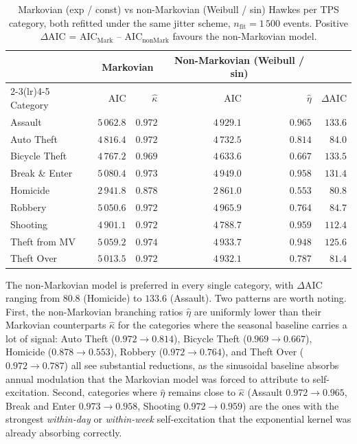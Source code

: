 \documentclass[article,shortnames,nojss]{jss}
\begin{document}
\begin{table}[h]
\centering\small
\caption{Markovian (exp / const) vs non-Markovian (Weibull / sin)
Hawkes per TPS category, both refitted under the same jitter
scheme, $n_{\mathrm{fit}} = 1\,500$ events.  Positive
$\Delta\mathrm{AIC}$ = AIC$_{\text{Mark}}$ -- AIC$_{\text{nonMark}}$
favours the non-Markovian model.}\label{tab:hawkes-mvsnm}
\begin{tabular}{lrrrrr}
\toprule
& \multicolumn{2}{c}{Markovian} &
   \multicolumn{2}{c}{Non-Markovian (Weibull / sin)} & \\
\cmidrule(lr){2-3}\cmidrule(lr){4-5}
Category & AIC & $\hat\kappa$ & AIC & $\hat\eta$ & $\Delta\mathrm{AIC}$\\\midrule
Assault       & $5\,062.8$ & $0.972$ & $4\,929.1$ & $0.965$ & $133.6$\\
Auto Theft    & $4\,816.4$ & $0.972$ & $4\,732.5$ & $0.814$ & $\phantom{0}84.0$\\
Bicycle Theft & $4\,767.2$ & $0.969$ & $4\,633.6$ & $0.667$ & $133.5$\\
Break \& Enter& $5\,080.4$ & $0.973$ & $4\,949.0$ & $0.958$ & $131.4$\\
Homicide      & $2\,941.8$ & $0.878$ & $2\,861.0$ & $0.553$ & $\phantom{0}80.8$\\
Robbery       & $5\,050.6$ & $0.972$ & $4\,965.9$ & $0.764$ & $\phantom{0}84.7$\\
Shooting      & $4\,901.1$ & $0.972$ & $4\,788.7$ & $0.959$ & $112.4$\\
Theft from MV & $5\,059.2$ & $0.974$ & $4\,933.7$ & $0.948$ & $125.6$\\
Theft Over    & $5\,013.5$ & $0.972$ & $4\,932.1$ & $0.787$ & $\phantom{0}81.4$\\
\bottomrule
\end{tabular}
\end{table}

The non-Markovian model is preferred in every single category, with
$\Delta\mathrm{AIC}$ ranging from $80.8$ (Homicide) to $133.6$
(Assault).  Two patterns are worth noting.  First, the
non-Markovian branching ratios $\hat\eta$ are uniformly lower than
their Markovian counterparts $\hat\kappa$ for the categories where
the seasonal baseline carries a lot of signal: Auto Theft
($0.972 \to 0.814$), Bicycle Theft ($0.969 \to 0.667$), Homicide
($0.878 \to 0.553$), Robbery ($0.972 \to 0.764$), and Theft Over
($0.972 \to 0.787$) all see substantial reductions, as the
sinusoidal baseline absorbs annual modulation that the Markovian
model was forced to attribute to self-excitation.  Second,
categories where $\hat\eta$ remains close to $\hat\kappa$
(Assault $0.972 \to 0.965$, Break and Enter $0.973 \to 0.958$,
Shooting $0.972 \to 0.959$) are the ones with the strongest
\emph{within-day} or \emph{within-week} self-excitation that the
exponential kernel was already absorbing correctly.
\end{document}
